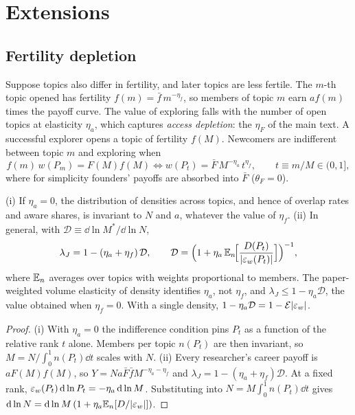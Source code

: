 \section{Extensions}\label{app:extensions}

\subsection{Fertility depletion}\label{app:fertility}

Suppose topics also differ in fertility, and later topics are less fertile.
The $m$-th topic opened has fertility $f(m)=\bar f\,m^{-\eta_f}$, so members of
topic $m$ earn $a f(m)$ times the payoff curve. The value of exploring falls
with the number of open topics at elasticity $\eta_a$, which captures
\emph{access depletion}: the $\eta_F$ of the main text. A successful explorer
opens a topic of fertility $f(M)$. Newcomers are indifferent between topic $m$
and exploring when
\[
f(m)\,w(P_m)=F(M)f(M)\iff w(P_t)=\bar F\,M^{-\eta_a}\,t^{\eta_f},\qquad t\equiv m/M\in(0,1],
\]
where for simplicity founders' payoffs are absorbed into $\bar F$ ($\theta_F=0$).
\begin{proposition}
(i) If $\eta_a=0$, the distribution of densities across topics, and hence of
overlap rates and aware shares, is invariant to $N$ and $a$, whatever the value of
$\eta_f$. (ii) In general, with $\mathcal D\equiv\dd\ln M^*/\dd\ln N$,
\[
\lambda_J=1-(\eta_a+\eta_f)\,\mathcal D,\qquad
\mathcal D=\Big(1+\eta_a\,\mathbb{E}_n\!\Big[\frac{D(P_t)}{|\varepsilon_w(P_t)|}\Big]\Big)^{-1},
\]
where $\mathbb{E}_n$ averages over topics with weights proportional to members. The
paper-weighted volume elasticity of density identifies $\eta_a$, not $\eta_f$, and
$\lambda_J\le1-\eta_a\mathcal D$, the value obtained when $\eta_f=0$. With a single
density, $1-\eta_a\mathcal D=1-\mathcal E|\varepsilon_w|$.
\end{proposition}
\begin{proof}
(i) With $\eta_a=0$ the indifference condition pins $P_t$ as a function of the
relative rank $t$ alone. Members per topic $n(P_t)$ are then invariant, so
$M=N/\int_0^1n(P_t)\dd t$ scales with $N$. (ii) Every researcher's career payoff is
$aF(M)f(M)$, so $Y=Na\bar F\bar f M^{-\eta_a-\eta_f}$ and
$\lambda_J=1-(\eta_a+\eta_f)\mathcal D$. At a fixed rank, $\varepsilon_w(P_t)\,\mathrm{d}\ln
P_t=-\eta_a\,\mathrm{d}\ln M$. Substituting into $N=M\int_0^1n(P_t)\dd t$ gives
$\mathrm{d}\ln N=\mathrm{d}\ln M\,(1+\eta_a\mathbb{E}_n[D/|\varepsilon_w|])$.
\end{proof}

